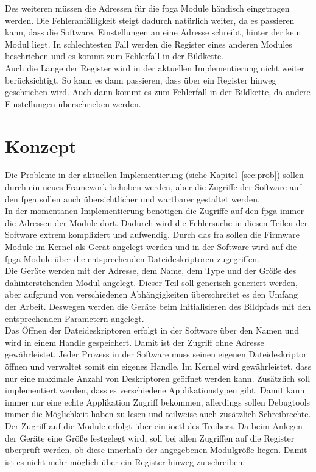 Des weiteren müssen die Adressen für die \ac{fpga} Module händisch eingetragen werden. Die Fehleranfälligkeit steigt dadurch natürlich weiter, da es passieren kann, dass die Software, Einstellungen an eine Adresse schreibt, hinter der kein Modul liegt. In schlechtesten Fall werden die Register eines anderen Modules beschrieben und es kommt zum Fehlerfall in der Bildkette.\\


Auch die Länge der Register wird in der aktuellen Implementierung nicht weiter berücksichtigt. So kann es dann passieren, dass über ein Register hinweg geschrieben wird. Auch dann kommt es zum Fehlerfall in der Bildkette, da andere Einstellungen überschrieben werden. 
 
\section{Konzept}\label{sec:konzept}
Die Probleme in der aktuellen Implementierung (siehe Kapitel~\ref{sec:prob}) sollen durch ein neues Framework behoben werden, aber die Zugriffe der Software auf den \ac{fpga} sollen auch übersichtlicher und wartbarer gestaltet werden. \\

In der momentanen Implementierung benötigen die Zugriffe auf den \ac{fpga} immer die Adressen der Module dort. Dadurch wird die Fehlersuche in diesen Teilen der Software extrem kompliziert und aufwendig. Durch das \ac{fra} sollen die Firmware Module im Kernel als Gerät angelegt werden und in der Software wird auf die \ac{fpga} Module über die entsprechenden Dateideskriptoren zugegriffen. \\


Die Geräte werden mit der Adresse, dem Name, dem Type und der Größe des dahinterstehenden Modul angelegt. Dieser Teil soll generisch generiert werden, aber aufgrund von verschiedenen Abhängigkeiten überschreitet es den Umfang der Arbeit. Deswegen werden die Geräte beim Initialisieren des Bildpfads mit den entsprechenden Parametern angelegt. \\

Das Öffnen der Dateideskriptoren erfolgt in der Software über den Namen und wird in einem Handle gespeichert. Damit ist der Zugriff ohne Adresse gewährleistet. Jeder Prozess in der Software muss seinen eigenen Dateideskriptor öffnen und verwaltet somit ein eigenes Handle. 
Im Kernel wird gewährleistet, dass nur eine maximale Anzahl von Deskriptoren geöffnet werden kann. Zusätzlich soll implementiert werden, dass es verschiedene Applikationstypen gibt. Damit kann immer nur eine echte Applikation Zugriff bekommen, allerdings sollen Debugtools immer die Möglichkeit haben zu lesen und teilweise auch zusätzlich Schreibrechte. \\

Der Zugriff auf die Module erfolgt über ein \ac{ioctl} des Treibers. Da beim Anlegen der Geräte eine Größe festgelegt wird, soll bei allen Zugriffen auf die Register überprüft werden, ob diese innerhalb der angegebenen Modulgröße liegen. Damit ist es nicht mehr möglich über ein Register hinweg zu schreiben.\\



